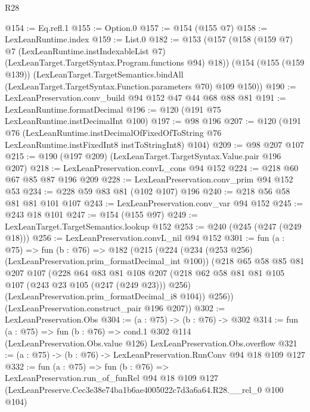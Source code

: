 \begin{lexlean}{R28}
\begin{coremodule}
@154 := Eq.refl.{1}
@155 := Option.{0}
@157 := @154 (@155 @7)
@158 := LexLeanRuntime.index
@159 := List.{0}
@182 := @153
    (@157
      (@158
        (@159 @7)
        @7
        (LexLeanRuntime.instIndexableList @7)
        (LexLeanTarget.TargetSyntax.Program.functions @94)
        @18))
    (@154
      (@155 (@159 @139))
      (LexLeanTarget.TargetSemantics.bindAll
        (LexLeanTarget.TargetSyntax.Function.parameters @70)
        @109
        @150))
@190 := LexLeanPreservation.conv_build @94 @152 @47 @44 @68 @88 @81
@191 := LexLeanRuntime.formatDecimal
@196 := @120 (@191 @75 LexLeanRuntime.instDecimalInt @100)
@197 := @98 @196
@207 := @120
    (@191
      @76
      (LexLeanRuntime.instDecimalOfFixedOfToString
        @76
        LexLeanRuntime.instFixedInt8
        instToStringInt8)
      @104)
@209 := @98 @207 @107
@215 := @190 (@197 @209) (LexLeanTarget.TargetSyntax.Value.pair @196 @207)
@218 := LexLeanPreservation.convL_cons @94 @152
@224 := @218 @60 @67 @85 @87 @196 @209
@228 := LexLeanPreservation.conv_prim @94 @152 @53
@234 := @228 @59 @83 @81 (@102 @107) @196
@240 := @218 @56 @58 @81 @81 @101 @107
@243 := LexLeanPreservation.conv_var @94 @152
@245 := @243 @18 @101
@247 := @154 (@155 @97)
@249 := LexLeanTarget.TargetSemantics.lookup @152
@253 := @240 (@245 (@247 (@249 @18)))
@256 := LexLeanPreservation.convL_nil @94 @152
@301 := fun (a : @75) =>
  fun (b : @76) =>
  @182
    (@215
      (@224
        (@234 (@253 @256) (LexLeanPreservation.prim_formatDecimal_int @100))
        (@218
          @65
          @58
          @85
          @81
          @207
          @107
          (@228
            @64
            @83
            @81
            @108
            @207
            (@218 @62 @58 @81 @81 @105 @107 (@243 @23 @105 (@247 (@249 @23))) @256)
            (LexLeanPreservation.prim_formatDecimal_i8 @104))
          @256))
      (LexLeanPreservation.construct_pair @196 @207))
@302 := LexLeanPreservation.Obs
@304 := (a : @75) -> (b : @76) -> @302
@314 := fun (a : @75) =>
  fun (b : @76) =>
  cond.{1} @302 @114 (LexLeanPreservation.Obs.value @126) LexLeanPreservation.Obs.overflow
@321 := (a : @75) -> (b : @76) -> LexLeanPreservation.RunConv @94 @18 @109 @127
@332 := fun (a : @75) =>
  fun (b : @76) =>
  LexLeanPreservation.run_of_funRel
    @94
    @18
    @109
    @127
    (LexLeanPreserve.Cec3e38e74ba1b6ae4005022c7d3a6a64.R28.__rel_0 @100 @104)
\end{coremodule}
\end{lexlean}
